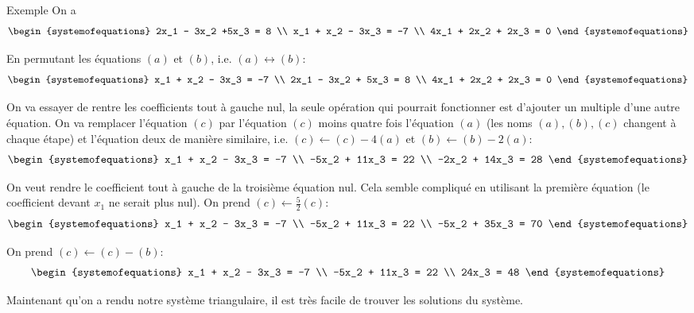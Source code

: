 \documentclass{article}
\begin{document}
\begin{parag}{Exemple}
    On a
    \[\begin{systemofequations}
    2x_1 - 3x_2 +5x_3 = 8  \\
    x_1 + x_2 - 3x_3 = -7  \\
    4x_1 + 2x_2 + 2x_3 = 0
    \end{systemofequations}\]

    En permutant les équations $(a)$ et $(b)$, i.e. $\left(a\right) \leftrightarrow \left(b\right)$:
    \[\begin{systemofequations}
    x_1 + x_2 - 3x_3 = -7  \\
    2x_1 - 3x_2 + 5x_3 = 8  \\
    4x_1 + 2x_2 + 2x_3 = 0
    \end{systemofequations}\]

    On va essayer de rentre les coefficients tout à gauche nul, la seule opération qui pourrait fonctionner est d'ajouter un multiple d'une autre équation. On va remplacer l'équation $(c)$ par l'équation $(c)$ moins quatre fois l'équation $(a)$ (les noms $\left(a\right), \left(b\right), \left(c\right)$ changent à chaque étape) et l'équation deux de manière similaire, i.e. $\left(c\right) \leftarrow \left(c\right) - 4\left(a\right)$ et $\left(b\right) \leftarrow \left(b\right) - 2\left(a\right)$:
    \[\begin{systemofequations}
    x_1 + x_2 - 3x_3 = -7  \\
    -5x_2 + 11x_3 = 22  \\
    -2x_2 + 14x_3 = 28
    \end{systemofequations}\]

    On veut rendre le coefficient tout à gauche de la troisième équation nul. Cela semble compliqué en utilisant la première équation (le coefficient devant $x_1$ ne serait plus nul). On prend $\left(c\right) \leftarrow \frac{5}{2}\left(c\right)$:
    \[\begin{systemofequations}
    x_1 + x_2 - 3x_3 = -7  \\
    -5x_2 + 11x_3 = 22  \\
    -5x_2 + 35x_3 = 70
    \end{systemofequations}\]

    On prend $\left(c\right) \leftarrow \left(c\right) - \left(b\right)$:
    \[\begin{systemofequations}
    x_1 + x_2 - 3x_3 = -7  \\
    -5x_2 + 11x_3 = 22  \\
    24x_3 = 48
    \end{systemofequations}\]

    Maintenant qu'on a rendu notre système triangulaire, il est très facile de trouver les solutions du système.
\end{parag}
\end{document}
